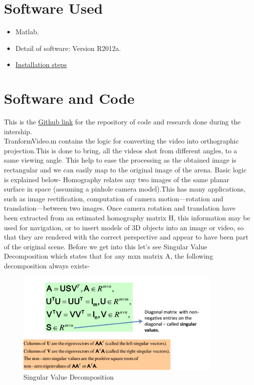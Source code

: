 \documentclass[a4paper,12pt,oneside]{book}
\begin{document}
\section{Software Used}
\begin{itemize}
  \item Matlab.
  \item Detail of software: Version R2012a. 
  \item \href{https://www.youtube.com/watch?v=krEPOXPvNIg}{Installation steps}
\end{itemize}

\section{Software and Code}
This is the \href{https://github.com/eYSIP-2016/Automatic-Theme-evaluation-from-videos}{Github link} for the repository of code and research done during the intership.\\
TranformVideo.m contains the logic for converting the video into orthographic projection.This is done to bring, all the videos shot from different angles, to a same viewing angle. This help to ease the processing as the obtained image is rectangular and we can easily map to the original image of the arena. Basic logic is explained below-
Homography relates any two images of the same planar surface in space (assuming a pinhole camera model).This has many applications, such as image rectification, computation of camera motion—rotation and translation—between two images. Once camera rotation and translation have been extracted from an estimated homography matrix H, this information may be used for navigation, or to insert models of 3D objects into an image or video, so that they are rendered with the correct perspective and appear to have been part of the original scene. Before we get into this let's see Singular Value Decomposition which states that for any mxn matrix A, the following decomposition always exists-  
    \begin{figure}[h!]
		\includegraphics[width=1\linewidth, height=5cm]{Capture-4.jpg}
		\centering
		\caption{Singular Value Decomposition}
	\end{figure}\\
\end{document}
